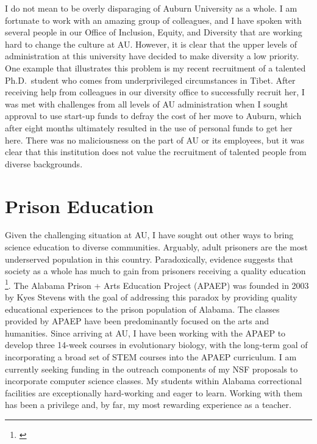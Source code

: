 I do not mean to be overly disparaging of Auburn University as a whole.
I am fortunate to work with an amazing group of colleagues, and
I have spoken with several people in our Office of Inclusion, Equity, and
Diversity that are working hard to change the culture at AU.
However, it is clear that the upper levels of administration at this university
have decided to make diversity a low priority.
One example that illustrates this problem is my recent recruitment of a
talented Ph.D.\ student who comes from underprivileged circumstances in Tibet.
After receiving help from colleagues in our diversity office to successfully
recruit her, I was met with challenges from all levels of AU administration
when I sought approval to use start-up funds to defray the cost of her move to
Auburn,
which after eight months ultimately resulted in the use of personal funds to
get her here.
There was no maliciousness on the part of AU or its employees,
but it was clear that this institution does not value the recruitment of
talented people from diverse backgrounds.


\section*{Prison Education}
Given the challenging situation at AU, I have sought out other ways to bring
science education to diverse communities.
Arguably, adult prisoners are the most underserved population in this country.
Paradoxically, evidence suggests that society as a whole has much to 
gain from prisoners receiving a quality education
\footnote{\label{Vacca04}}.
The Alabama Prison + Arts Education Project (APAEP) was founded in 2003 by Kyes
Stevens with the goal of addressing this paradox by providing quality
educational experiences to the prison population of Alabama.
The classes provided by APAEP have been predominantly focused on the
arts and humanities.
Since arriving at AU, I have been working with the APAEP to develop three
14-week courses in evolutionary biology, with the long-term goal of
incorporating a broad set of STEM courses into the APAEP curriculum.
I am currently seeking funding in the outreach components of my NSF proposals
to incorporate computer science classes.
My students within Alabama correctional facilities are exceptionally
hard-working and eager to learn.
Working with them has been a privilege and, by far, my most rewarding
experience as a teacher.
